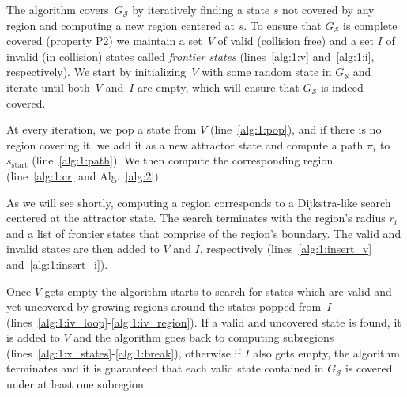 \documentclass[letterpaper]{article} %
\newcommand{\calS}{\ensuremath{\mathcal{S}}\xspace}
\newcommand{\sStart}{\ensuremath{s_{\text{start}}\xspace}}
\begin{document}
The algorithm covers~$G_\calS$ by iteratively finding a state $s$ not covered by any region and computing a new region centered at $s$.
To ensure that $G_\calS$ is complete covered (property P2) we maintain a set~$V$ of valid (collision free) and a set $I$ of invalid (in collision) states called \emph{frontier states} (lines~\ref{alg:1:v} and~\ref{alg:1:i}, respectively).
We start by initializing~$V$ with some random state in $G_\calS$ and iterate until both~$V$ and~$I$ are empty, which will ensure that $G_\calS$ is indeed covered.

At every iteration, we pop a state from $V$ (line~\ref{alg:1:pop}), and if there is no region covering it, we add it as a new attractor state and compute a path $\pi_i$ to $\sStart$ (line~\ref{alg:1:path}).
We then compute the corresponding region (line~\ref{alg:1:cr} and Alg.~\ref{alg:2}).

As we will see shortly, computing a region corresponds to a Dijkstra-like search centered at the attractor state.
The search terminates with the region's radius $r_i$ and a list of frontier states that comprise of the region's boundary.
The valid and invalid states are then added to $V$ and $I$, respectively (lines~\ref{alg:1:insert_v} and~\ref{alg:1:insert_i}).


Once $V$ gets empty the algorithm starts to search for states which are valid and yet uncovered by growing regions around the states popped from~$I$ (lines~\ref{alg:1:iv_loop}-\ref{alg:1:iv_region}). If a valid and uncovered state is found, it is added to $V$ and the algorithm goes back to computing subregions (lines~\ref{alg:1:x_states}-\ref{alg:1:break}), otherwise if $I$ also gets empty, the algorithm terminates and it is guaranteed that each valid state contained in $G_\calS$ is covered under at least one subregion.

\end{document}
